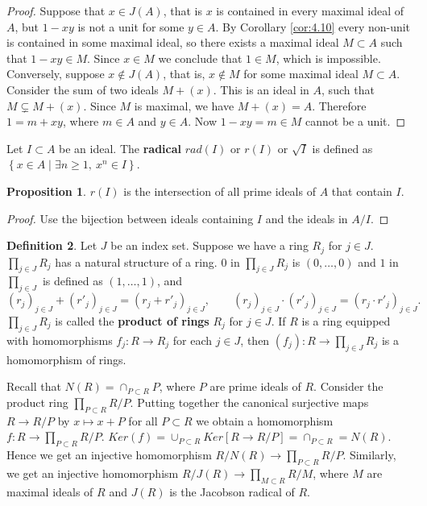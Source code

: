 \documentclass{article}
\newcommand{\rb}[1]{\left( #1 \right)}
\renewcommand{\sb}[1]{\left[ #1 \right]}
\newcommand{\cb}[1]{\left\{ #1 \right\}}
\theoremstyle{definition}\newtheorem{definition}{Definition}[section]
\theoremstyle{definition}\newtheorem{remark}[definition]{Remark}
\theoremstyle{definition}\newtheorem*{example}{Example}
\theoremstyle{definition}\newtheorem*{note}{Note}
\newtheorem{proposition}[definition]{Proposition}
\begin{document}
\begin{proof}
Suppose that $ x \in J\rb{A} $, that is $ x $ is contained in every maximal ideal of $ A $, but $ 1 - xy $ is not a unit for some $ y \in A $. By Corollary \ref{cor:4.10} every non-unit is contained in some maximal ideal, so there exists a maximal ideal $ M \subset A $ such that $ 1 - xy \in M $. Since $ x \in M $ we conclude that $ 1 \in M $, which is impossible. Conversely, suppose $ x \notin J\rb{A} $, that is, $ x \notin M $ for some maximal ideal $ M \subset A $. Consider the sum of two ideals $ M + \rb{x} $. This is an ideal in $ A $, such that $ M \subsetneq M + \rb{x} $. Since $ M $ is maximal, we have $ M + \rb{x} = A $. Therefore $ 1 = m + xy $, where $ m \in A $ and $ y \in A $. Now $ 1 - xy = m \in M $ cannot be a unit.
\end{proof}

Let $ I \subset A $ be an ideal. The \textbf{radical} $ rad\rb{I} $ or $ r\rb{I} $ or $ \sqrt{I} $ is defined as $ \cb{x \in A \mid \exists n \ge 1, \ x^n \in I} $.

\begin{proposition}
$ r\rb{I} $ is the intersection of all prime ideals of $ A $ that contain $ I $.
\end{proposition}

\begin{proof}
Use the bijection between ideals containing $ I $ and the ideals in $ A / I $.
\end{proof}


\begin{definition}
Let $ J $ be an index set. Suppose we have a ring $ R_j $ for $ j \in J $. $ \prod_{j \in J} R_j $ has a natural structure of a ring. $ 0 $ in $ \prod_{j \in J} R_j $ is $ \rb{0, \dots, 0} $ and $ 1 $ in $ \prod_{j \in J} $ is defined as $ \rb{1, \dots, 1} $, and
$$ \rb{r_j}_{j \in J} + \rb{r'_j}_{j \in J} = \rb{r_j + r'_j}_{j \in J}, \qquad \rb{r_j}_{j \in J} \cdot \rb{r'_j}_{j \in J} = \rb{r_j \cdot r'_j}_{j \in J}. $$
$ \prod_{j \in J} R_j $ is called the \textbf{product of rings} $ R_j $ for $ j \in J $. If $ R $ is a ring equipped with homomorphisms $ f_j : R \to R_j $ for each $ j \in J $, then $ \rb{f_j} : R \to \prod_{j \in J} R_j $ is a homomorphism of rings.
\end{definition}

Recall that $ N\rb{R} = \cap_{P \subset R} P $, where $ P $ are prime ideals of $ R $. Consider the product ring $ \prod_{P \subset R} R / P $. Putting together the canonical surjective maps $ R \to R / P $ by $ x \mapsto x + P $ for all $ P \subset R $ we obtain a homomorphism $ f : R \to \prod_{P \subset R} R / P $. $ Ker\rb{f} = \cup_{P \subset R} Ker\sb{R \to R / P} = \cap_{P \subset R} = N\rb{R} $. Hence we get an injective homomorphism $ R / N\rb{R} \to \prod_{P \subset R} R / P $. Similarly, we get an injective homomorphism $ R / J\rb{R} \to \prod_{M \subset R} R / M $, where $ M $ are maximal ideals of $ R $ and $ J\rb{R} $ is the Jacobson radical of $ R $.
\end{document}
